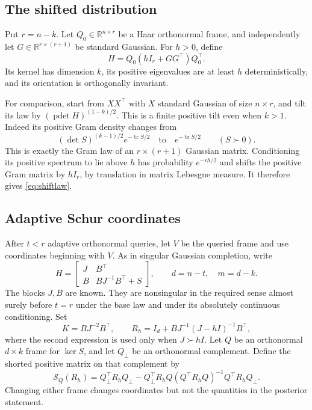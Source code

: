 \documentclass[11pt]{article}
\theoremstyle{definition}
\newcommand{\R}{\mathbb R}
\newcommand{\tr}{\operatorname{tr}}
\newcommand{\pdet}{\operatorname{pdet}}
\begin{document}
\subsection{The shifted distribution}
Put $r=n-k$. Let $Q_0\in\R^{n\times r}$ be a Haar orthonormal frame, and independently let $G\in\R^{r\times(r+1)}$ be standard Gaussian. For $h>0$, define
\begin{equation}\label{eq:shiftlaw}
H=Q_0(hI_r+GG^\top)Q_0^\top.
\end{equation}
Its kernel has dimension $k$, its positive eigenvalues are at least $h$ deterministically, and its orientation is orthogonally invariant.

For comparison, start from $XX^\top$ with $X$ standard Gaussian of size $n\times r$, and tilt its law by $(\pdet H)^{(1-k)/2}$. This is a finite positive tilt even when $k>1$. Indeed its positive Gram density changes from
\[
(\det S)^{(k-1)/2}e^{-\tr S/2}
\quad\text{to}\quad e^{-\tr S/2}\qquad(S\succ0).
\]
This is exactly the Gram law of an $r\times(r+1)$ Gaussian matrix. Conditioning its positive spectrum to lie above $h$ has probability $e^{-rh/2}$ and shifts the positive Gram matrix by $hI_r$, by translation in matrix Lebesgue measure. It therefore gives \eqref{eq:shiftlaw}.

\subsection{Adaptive Schur coordinates}
After $t<r$ adaptive orthonormal queries, let $V$ be the queried frame and use coordinates beginning with $V$. As in singular Gaussian completion, write
\begin{equation}\label{eq:schurshift}
H=\begin{bmatrix}J&B^\top\\B&BJ^{-1}B^\top+S\end{bmatrix},
\qquad d=n-t,\quad m=d-k.
\end{equation}
The blocks $J,B$ are known. They are nonsingular in the required sense almost surely before $t=r$ under the base law and under its absolutely continuous conditioning. Set
\begin{equation}\label{eq:KR}
K=BJ^{-2}B^\top,\qquad
R_h=I_d+BJ^{-1}(J-hI)^{-1}B^\top,
\end{equation}
where the second expression is used only when $J\succ hI$. Let $Q$ be an orthonormal $d\times k$ frame for $\ker S$, and let $Q_\perp$ be an orthonormal complement. Define the shorted positive matrix on that complement by
\begin{equation}\label{eq:short}
\mathcal S_Q(R_h)=Q_\perp^\top R_hQ_\perp
-Q_\perp^\top R_hQ(Q^\top R_hQ)^{-1}Q^\top R_hQ_\perp.
\end{equation}
Changing either frame changes coordinates but not the quantities in the posterior statement.
\end{document}
